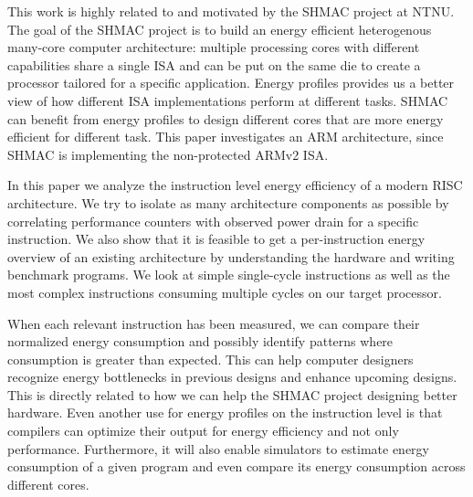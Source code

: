 This work is highly related to and motivated by the SHMAC
project\cite{ntnushmac,Umuroglu662354,rusten2012implementing} at NTNU. The goal of
the SHMAC project is to build an energy efficient heterogenous many-core
computer architecture: multiple processing cores with different capabilities
share a single ISA and can be put on the same die to create a processor tailored
for a specific application. Energy profiles provides us a better view of how
different ISA implementations perform at different tasks\cite{kumar2003single}.
SHMAC can benefit from energy profiles to design different cores that are more
energy efficient for different task.  This paper investigates an ARM
architecture, since SHMAC is implementing the non-protected ARMv2 ISA.

In this paper we analyze the instruction level energy efficiency of a modern
RISC architecture. We try to isolate as many architecture components as possible
by correlating performance counters with observed power drain for a specific
instruction. We also show that it is feasible to get a per-instruction energy
overview of an existing architecture by understanding the hardware and writing
benchmark programs. We look at simple single-cycle instructions as well as the
most complex instructions consuming multiple cycles on our target processor.

When each relevant instruction has been measured, we can compare their
normalized energy consumption and possibly identify patterns where consumption
is greater than expected. This can help computer designers recognize energy
bottlenecks in previous designs and enhance upcoming designs. This is directly
related to how we can help the SHMAC project designing better hardware. Even
another use for energy profiles on the instruction level is that compilers can
optimize their output for energy efficiency and not only performance.
Furthermore, it will also enable simulators to estimate energy consumption of a
given program and even compare its energy consumption across different cores.
